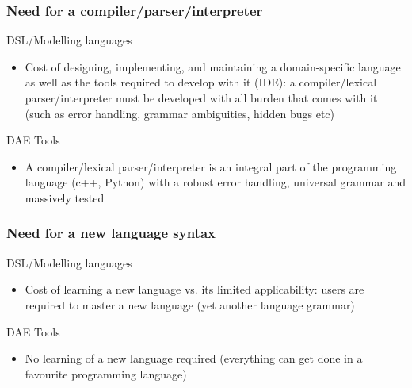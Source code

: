 \documentclass[compress,newPxFont,sthlmFooter]{beamer}
\begin{document}
\begin{frame}
\frametitle{Need for a compiler/parser/interpreter}
\begin{block}{\textcolor{light_red}{DSL/Modelling languages}}
\begin{itemize}
  \item Cost of designing, implementing, and maintaining a domain-specific language as well as the tools required to develop with it (IDE):
        a compiler/lexical parser/interpreter must be developed with all burden that comes with it (such as error handling, grammar ambiguities,
        hidden bugs etc)
\end{itemize}
\end{block}

\begin{block}{\textcolor{light_green}{DAE Tools}}
\begin{itemize}
  \item A compiler/lexical parser/interpreter is an integral part of the programming language (c++, Python) with a robust error handling,
        universal grammar and massively tested
\end{itemize}
\end{block}
\end{frame}

\begin{frame}
\frametitle{Need for a new language syntax}
\begin{block}{\textcolor{light_red}{DSL/Modelling languages}}
\begin{itemize}
  \item Cost of learning a new language vs. its limited applicability: users are required to master a new language
        (yet another language grammar)
\end{itemize}
\end{block}

\begin{block}{\textcolor{light_green}{DAE Tools}}
\begin{itemize}
  \item No learning of a new language required (everything can get done in a favourite programming language)
\end{itemize}
\end{block}
\end{frame}
\end{document}
